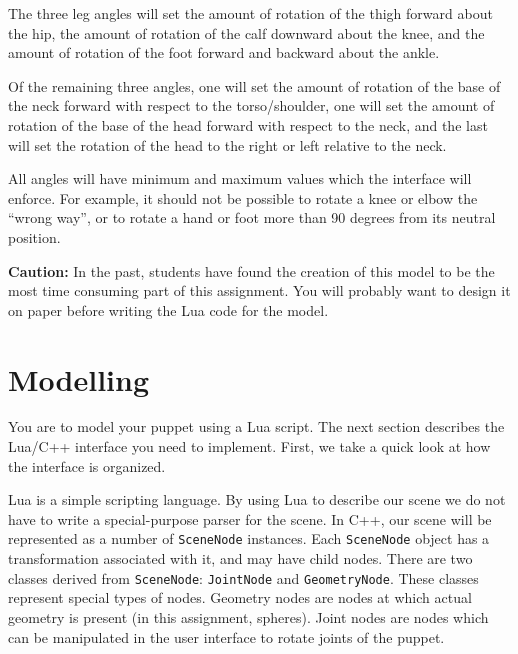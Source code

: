The three leg angles will set the amount of rotation of the thigh
forward about the hip, the amount of rotation of the calf 
downward about the knee, and the amount of rotation of the foot
forward and backward about the ankle.

Of the remaining three angles,
one will set the amount of rotation of the base of the
neck forward with respect to the torso/shoulder, one 
will set the amount of rotation of the base of the head
forward with respect to the neck,
and the last will set the rotation of the head to the right or left
relative to the neck.

All angles will have minimum and maximum values which the interface
will enforce.   For example, it should not be possible to rotate
a knee or elbow the ``wrong way'', or to rotate a hand or foot more than
90 degrees from its neutral position.

{\bf Caution:} In the past, students have found the creation of
this model to be the most time consuming part of this assignment.
You will probably want to design it on paper before writing the
Lua code for the model.   

\section{Modelling}

You are to model your puppet using a Lua script.  The next section
describes the Lua/C++ interface you need to implement.  First, we 
take a quick look at how the interface is organized.

Lua is a simple scripting language. By using Lua to describe our scene
we do not have to write a special-purpose parser for the scene.
In C++, our scene will be represented as a number of
\texttt{Scene\-Node} instances. Each \texttt{Scene\-Node} object has a
transformation associated with it, and may have child nodes. There are
two classes derived from \texttt{Scene\-Node}: \texttt{Joint\-Node}
and \texttt{Geometry\-Node}. These classes represent special types of
nodes. Geometry nodes are nodes at which actual geometry is present
(in this assignment, spheres). Joint nodes are nodes which can be
manipulated in the user interface to rotate joints of the
puppet. 

